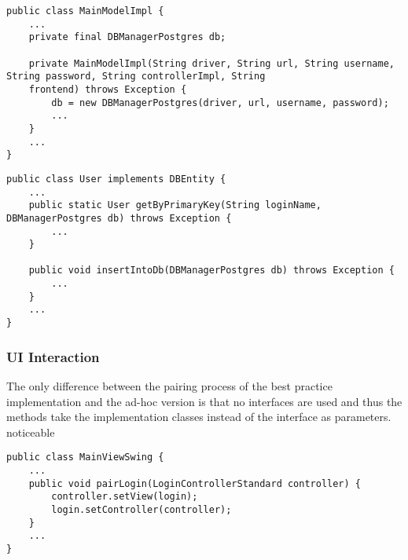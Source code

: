 \begin{lstlisting}[caption={Code snippet showing how the DBManager is instantiated. Again no interfaces but rather concrete implementations are used. The singleton class seen in listing \ref{lst:dbmanager} does not exist in the ad-hoc version.}, captionpos=b]
public class MainModelImpl {
	...
	private final DBManagerPostgres db;
	
	private MainModelImpl(String driver, String url, String username, String password, String controllerImpl, String
	frontend) throws Exception {
		db = new DBManagerPostgres(driver, url, username, password);
		...
	}
	...
}
\end{lstlisting}

\begin{lstlisting}[caption={Code snippet showing a database access methods in a data class. The retrieval method takes arguments necessary for the query and the database-manager object as parameters and is static, while the update method is not static and therefore performs the operation on the current object instance.}, captionpos=b, label={lst:static-methods}]
public class User implements DBEntity {	
	...
	public static User getByPrimaryKey(String loginName, DBManagerPostgres db) throws Exception {
		...
	}
	
	public void insertIntoDb(DBManagerPostgres db) throws Exception {
		...
	}
	...
}
\end{lstlisting}

\subsubsection{UI Interaction}
The only difference between the pairing process of the best practice implementation and the ad-hoc version is that no interfaces are used and thus the methods take the implementation  classes instead of the interface as parameters. 
noticeable 
\begin{lstlisting}[caption={Code snippet showing pairing code of the ad-hoc version of the program. It is noticeable that the pairing method takes a concrete implementation rather than an interface as a parameter. This differs from the best practice version seen in \ref{lst:pairing} which takes only the interface as parameter.}, captionpos=b]
public class MainViewSwing {
	...
	public void pairLogin(LoginControllerStandard controller) {
		controller.setView(login);
		login.setController(controller);
	}
	...
}
\end{lstlisting}

